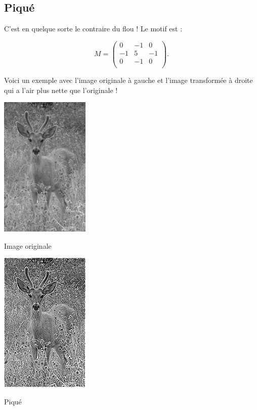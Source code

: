\documentclass[11pt,class=report,crop=false]{standalone}
\begin{document}
\subsection{Piqué}

C'est en quelque sorte le contraire du flou ! Le motif est : 

$$M = 
\begin{pmatrix}
0&-1&0\\
-1&5&-1\\
0&-1&0\\
\end{pmatrix}.$$

Voici un exemple avec l'image originale à gauche et l'image transformée à droite qui a l'air plus nette que l'originale !

\begin{center}
	\begin{minipage}{0.45\textwidth}\center
       \includegraphics[scale=\myscale,scale=0.7]{figures/image_pique_avant}
	
	Image originale
	\end{minipage}
	\begin{minipage}{0.45\textwidth}\center
	 \includegraphics[scale=\myscale,scale=0.7]{figures/image_pique_apres}
	
	Piqué
    \end{minipage}	
\end{center}
\end{document}
